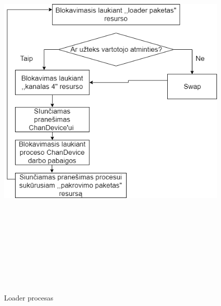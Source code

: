 \documentclass[oneside]{VUMIFPSkursinis}
\begin{document}
\begin{figure}[H]
		\centering	
	\includegraphics[width=18cm,height=20cm,keepaspectratio]{Loader.png}
	\caption{Loader procesas}
	\label{fig:Loader procesas}
\end{figure}
\end{document}
